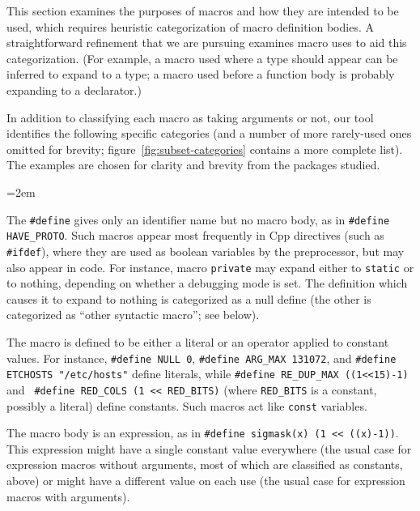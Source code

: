 \documentclass[11pt]{article}
\begin{document}
This section examines the purposes of macros and how they are intended to
be used, which requires heuristic categorization of macro definition bodies.  A
straightforward refinement that we are pursuing examines macro uses to aid
this categorization.  (For example, a macro used where a type should appear
can be inferred to expand to a type; a macro used before a function body is
probably expanding to a declarator.)

In addition to classifying each macro as taking arguments or not, our tool
identifies the following specific categories (and a number of more
rarely-used ones omitted for brevity;
figure~\ref{fig:subset-categories} contains a more complete list).  The examples
are chosen for clarity and brevity from the packages studied.

\begin{description}
  \sloppy
  \emergencystretch=2em

\item[Null define]  The {\tt \#define} gives only an
  identifier name but no macro body, as in {\tt \#define
  \verb|HAVE_PROTO|}\@.  Such macros appear most frequently in Cpp
directives (such as {\tt \#ifdef}), where they are used as boolean
variables by the preprocessor, but may also appear in code.  For instance,
macro {\tt private} may expand either to {\tt static} or to nothing,
depending on whether a debugging mode is set.  The definition which
causes it to expand to nothing is categorized as a null define (the
other is categorized as ``other syntactic macro'';  see below).

\item[Constant] The macro is defined to be either a literal or an operator
  applied to constant values.  For instance, {\tt \#define NULL 0}, {\tt \#define
  \verb|ARG_MAX| 131072}, and {\tt \#define ETCHOSTS "/etc/hosts"} define
literals, while {\tt \#define \verb|RE_DUP_MAX| ((1<<15)-1)} and {\tt
\#define \verb|RED_COLS| (1 << \verb|RED_BITS|)} (where \verb|RED_BITS| is
a constant, possibly a literal) define constants.  Such macros act like
{\tt const} variables.

\item[Expression]  The macro body is an expression, as in {\tt \#define
  sigmask(x) (1 << ((x)-1))}.  This expression might have a single constant
value everywhere (the usual case for expression macros without arguments,
most of which are classified as constants, above) or might have a
different value on each use (the usual case for expression macros with
arguments).


\end{description}
\end{document}
